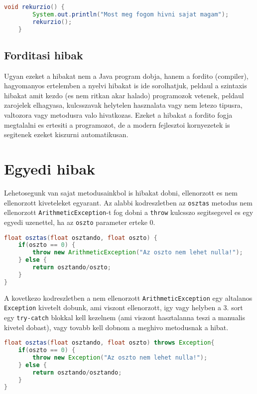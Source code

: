 \documentclass{article}
\let\l\lstinline
\begin{document}
\begin{lstlisting}[language=Java, caption=Vegtelen rekurzio ami StackOverFlowError-t fog okozni]
	void rekurzio() {
		System.out.println("Most meg fogom hivni sajat magam");
		rekurzio();
	}
\end{lstlisting}

\subsection{Forditasi hibak}

Ugyan ezeket a hibakat nem a Java program dobja, hanem a fordito (compiler), hagyomanyos ertelemben a nyelvi hibakat is ide sorolhatjuk, peldaul a szintaxis hibakat amit kezdo (es nem ritkan akar halado) programozok vetenek, peldaul zarojelek elhagyasa, kulcsszavak helytelen hasznalata vagy nem letezo tipusra, valtozora vagy metodusra valo hivatkozas. Ezeket a hibakat a fordito fogja megtalalni es ertesiti a programozot, de a modern fejlesztoi kornyezetek is segitenek ezeket kiszurni automatikusan.

\newpage

\section{Egyedi hibak}

Lehetosegunk van sajat metodusainkbol is hibakat dobni, ellenorzott es nem ellenorzott kiveteleket egyarant. Az alabbi kodreszletben az \l{osztas} metodus nem ellenorzott \l{ArithmeticException}-t fog dobni a \l{throw} kulcsszo segitsegevel es egy egyedi uzenettel, ha az \l{oszto} parameter erteke 0.

\begin{lstlisting}[language=Java, caption=ArithmeticException dobasa manualisan]
float osztas(float osztando, float oszto) {
    if(oszto == 0) {
        throw new ArithmeticException("Az oszto nem lehet nulla!");
    } else {
        return osztando/oszto;
    }
}
\end{lstlisting}

A kovetkezo kodreszletben a nem ellenorzott \l{ArithmeticException} egy altalanos \l{Exception} kivetelt dobunk, ami viszont ellenorzott, igy vagy helyben a 3. sort egy \l{try-catch} blokkal kell kezelnem (ami viszont hasztalanna teszi a manualis kivetel dobast), vagy tovabb kell dobnom a meghivo metodusnak a hibat.

\begin{lstlisting}[language=Java, caption=Exception dobasa manualisan]
float osztas(float osztando, float oszto) throws Exception{
    if(oszto == 0) {
        throw new Exception("Az oszto nem lehet nulla!");
    } else {
        return osztando/osztando;
    }
}
\end{lstlisting}
\newpage
\end{document}
